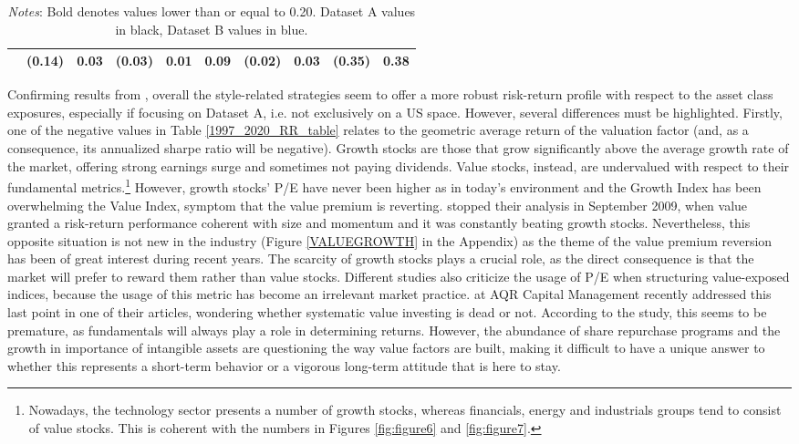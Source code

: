 \documentclass[12pt]{article}
\begin{document}
\begin{table}[H]
{\begin{tabular}{@{}lccccccccc@{}}
                      & {\color[HTML]{303498} \textbf{(0.14)}} & {\color[HTML]{303498} \textbf{0.03}}   & {\color[HTML]{303498} \textbf{(0.03)}} & {\color[HTML]{303498} \textbf{0.01}}   & {\color[HTML]{303498} \textbf{0.09}}                     & {\color[HTML]{303498} \textbf{(0.02)}} & {\color[HTML]{303498} \textbf{0.03}}                    & {\color[HTML]{303498} \textbf{(0.35)}}                      & {\color[HTML]{303498} 0.38}                           \\ \bottomrule
\end{tabular}}
\medskip
\caption*{\textit{Notes}: Bold denotes values lower than or equal to 0.20. Dataset A values in black, Dataset B values in blue.}
\end{table}

Confirming results from , overall the style-related strategies seem to offer a more robust risk-return profile with respect to the asset class exposures, especially if focusing on Dataset A, i.e. not exclusively on a US space. However, several differences must be highlighted. Firstly, one of the negative values in Table \ref{1997_2020_RR_table} relates to the geometric average return of the valuation factor (and, as a consequence, its annualized sharpe ratio will be negative). Growth stocks are those that grow significantly above the average growth rate of the market, offering strong earnings surge and sometimes not paying dividends. Value stocks, instead, are undervalued with respect to their fundamental metrics.\footnote{Nowadays, the technology sector presents a number of growth stocks, whereas financials, energy and industrials groups tend to consist of value stocks. This is coherent with the numbers in Figures \ref{fig:figure6} and \ref{fig:figure7}.} However, growth stocks' P/E have never been higher as in today's environment and the Growth Index has been overwhelming the Value Index, symptom that the value premium is reverting.  stopped their analysis in September 2009, when value granted a risk-return performance coherent with size and momentum and it was constantly beating growth stocks. Nevertheless, this opposite situation is not new in the industry (Figure \ref{VALUEGROWTH} in the Appendix) as the theme of the value premium reversion has been of great interest during recent years. The scarcity of growth stocks plays a crucial role, as the direct consequence is that the market will prefer to reward them rather than value stocks. Different studies also criticize the usage of P/E when structuring value-exposed indices, because the usage of this metric has become an irrelevant market practice.  at AQR Capital Management recently addressed this last point in one of their articles, wondering whether systematic value investing is dead or not. According to the study, this seems to be premature, as fundamentals will always play a role in determining returns. However, the abundance of share repurchase programs and the growth in importance of intangible assets are questioning the way value factors are built, making it difficult to have a unique answer to whether this represents a short-term behavior or a vigorous long-term attitude that is here to stay.
\end{document}
